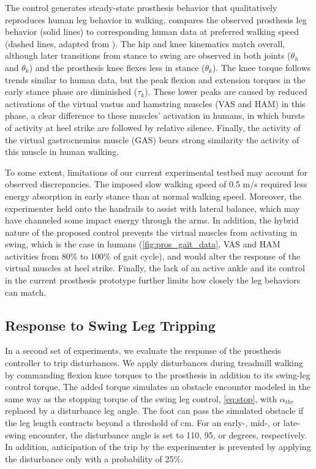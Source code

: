 The control generates steady-state prosthesis behavior that qualitatively
reproduces human leg behavior in walking.  compares the
observed prosthesis leg behavior (solid lines) to corresponding human data at
preferred walking speed (dashed lines, adapted from
\citet{winter2009biomechanics,perry2010gait}). The hip and knee kinematics match
overall, although later transitions from stance to swing are observed in both
joints ($\theta_h$ and $\theta_k$) and the prosthesis knee flexes less in stance
($\theta_k$). The knee torque follows trends similar to human data, but the peak
flexion and extension torques in the early stance phase are diminished
($\tau_k$). These lower peaks are caused by reduced activations of the virtual
vastus and hamstring muscles (VAS and HAM) in this phase, a clear difference to
these muscles' activation in humans, in which bursts of activity at heel strike
are followed by relative silence. Finally, the activity of the virtual
gastrocnemius muscle (GAS) bears strong similarity the activity of this muscle
in human walking.

To some extent, limitations of our current experimental testbed may
account for observed discrepancies. The imposed slow walking speed of 0.5 m/s
required less energy absorption in early stance than at normal walking speed.
Moreover, the experimenter held onto the handrails to assist with lateral
balance, which may have channeled some impact energy through the arms. In
addition, the hybrid nature of the proposed control prevents the virtual
muscles from activating in swing, which is the case in humans
(\cref{fig:pros_gait_data}, VAS and HAM activities from 80\% to 100\% of gait
cycle), and would alter the response of the virtual muscles at heel strike.
Finally, the lack of an active ankle and its control in the current prosthesis
prototype further limits how closely the leg behaviors can match.

\subsection{Response to Swing Leg Tripping} 

In a second set of experiments, we evaluate the response of the prosthesis
controller to trip disturbances. We apply disturbances during treadmill walking
by commanding flexion knee torques to the prosthesis in addition to its
swing-leg control torque. The added torque simulates an obstacle encounter
modeled in the same way as the stopping torque of the swing leg control,
\cref{eq:stop}, with $\alpha_{thr}$ replaced by a disturbance leg angle. The
foot can pass the simulated obstacle if the leg length contracts beyond a
threshold of \unit[94]{cm}. For an early-, mid-, or late-swing encounter, the
disturbance angle is set to 110, 95, or \unit[80]{degrees}, respectively. In
addition, anticipation of the trip by the experimenter is prevented by applying
the disturbance only with a probability of 25\%.

